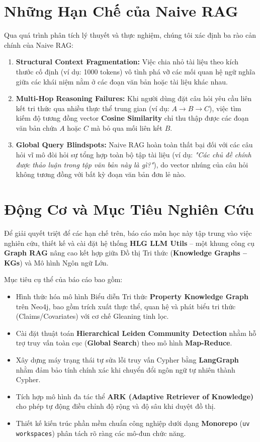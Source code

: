 \documentclass[11pt,a4paper]{report}
\begin{document}
\section{Những Hạn Chế của Naive RAG}
Qua quá trình phân tích lý thuyết và thực nghiệm, chúng tôi xác định ba rào cản chính của Naive RAG:
\begin{enumerate}
    \item \textbf{Structural Context Fragmentation:} Việc chia nhỏ tài liệu theo kích thước cố định (ví dụ: 1000 tokens) vô tình phá vỡ các mối quan hệ ngữ nghĩa giữa các khái niệm nằm ở các đoạn văn bản hoặc tài liệu khác nhau.
    \item \textbf{Multi-Hop Reasoning Failures:} Khi người dùng đặt câu hỏi yêu cầu liên kết tri thức qua nhiều thực thể trung gian (ví dụ: $A \to B \to C$), việc tìm kiếm độ tương đồng vector \textbf{Cosine Similarity} chỉ thu thập được các đoạn văn bản chứa $A$ hoặc $C$ mà bỏ qua mối liên kết $B$.
    \item \textbf{Global Query Blindspots:} Naive RAG hoàn toàn thất bại đối với các câu hỏi vĩ mô đòi hỏi sự tổng hợp toàn bộ tập tài liệu (ví dụ: \textit{"Các chủ đề chính được thảo luận trong tập văn bản này là gì?"}), do vector nhúng của câu hỏi không tương đồng với bất kỳ đoạn văn bản đơn lẻ nào.
\end{enumerate}

\section{Động Cơ và Mục Tiêu Nghiên Cứu}
Để giải quyết triệt để các hạn chế trên, báo cáo môn học này tập trung vào việc nghiên cứu, thiết kế và cài đặt hệ thống \textbf{HLG LLM Utils} -- một khung công cụ \textbf{Graph RAG} nâng cao kết hợp giữa Đồ thị Tri thức (\textbf{Knowledge Graphs -- KGs}) và Mô hình Ngôn ngữ Lớn.

Mục tiêu cụ thể của báo cáo bao gồm:
\begin{itemize}
    \item Hình thức hóa mô hình Biểu diễn Tri thức \textbf{Property Knowledge Graph} trên Neo4j, bao gồm trích xuất thực thể, quan hệ và phát biểu tri thức (Claims/Covariates) với cơ chế Gleaning tinh lọc.
    \item Cài đặt thuật toán \textbf{Hierarchical Leiden Community Detection} nhằm hỗ trợ truy vấn toàn cục (\textbf{Global Search}) theo mô hình \textbf{Map-Reduce}.
    \item Xây dựng máy trạng thái tự sửa lỗi truy vấn Cypher bằng \textbf{LangGraph} nhằm đảm bảo tính chính xác khi chuyển đổi ngôn ngữ tự nhiên thành Cypher.
    \item Tích hợp mô hình đa tác thể \textbf{ARK (Adaptive Retriever of Knowledge)} cho phép tự động điều chỉnh độ rộng và độ sâu khi duyệt đồ thị.
    \item Thiết kế kiến trúc phần mềm chuẩn công nghiệp dưới dạng \textbf{Monorepo} (\texttt{uv workspaces}) phân tách rõ ràng các mô-đun chức năng.
\end{itemize}
\end{document}
